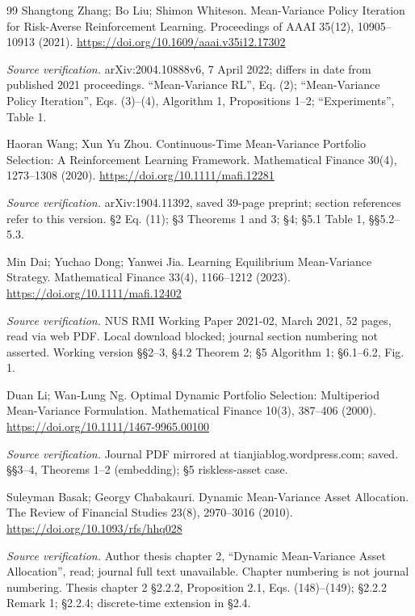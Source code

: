 \documentclass[11pt,a4paper]{article}
\theoremstyle{plain}
\theoremstyle{definition}
\begin{document}
\begin{thebibliography}{99}
 Shangtong Zhang; Bo Liu; Shimon Whiteson. Mean-Variance Policy Iteration for Risk-Averse Reinforcement Learning. Proceedings of AAAI 35(12), 10905--10913 (2021). \url{https://doi.org/10.1609/aaai.v35i12.17302}
\par\smallskip\noindent\emph{Source verification.} arXiv:2004.10888v6, 7 April 2022; differs in date from published 2021 proceedings. ``Mean-Variance RL'', Eq. (2); ``Mean-Variance Policy Iteration'', Eqs. (3)--(4), Algorithm 1, Propositions 1--2; ``Experiments'', Table 1.

 Haoran Wang; Xun Yu Zhou. Continuous-Time Mean-Variance Portfolio Selection: A Reinforcement Learning Framework. Mathematical Finance 30(4), 1273--1308 (2020). \url{https://doi.org/10.1111/mafi.12281}
\par\smallskip\noindent\emph{Source verification.} arXiv:1904.11392, saved 39-page preprint; section references refer to this version. \S{}2 Eq. (11); \S{}3 Theorems 1 and 3; \S{}4; \S{}5.1 Table 1, \S{}\S{}5.2--5.3.

 Min Dai; Yuchao Dong; Yanwei Jia. Learning Equilibrium Mean-Variance Strategy. Mathematical Finance 33(4), 1166--1212 (2023). \url{https://doi.org/10.1111/mafi.12402}
\par\smallskip\noindent\emph{Source verification.} NUS RMI Working Paper 2021-02, March 2021, 52 pages, read via web PDF. Local download blocked; journal section numbering not asserted. Working version \S{}\S{}2--3, \S{}4.2 Theorem 2; \S{}5 Algorithm 1; \S{}6.1--6.2, Fig. 1.

 Duan Li; Wan-Lung Ng. Optimal Dynamic Portfolio Selection: Multiperiod Mean-Variance Formulation. Mathematical Finance 10(3), 387--406 (2000). \url{https://doi.org/10.1111/1467-9965.00100}
\par\smallskip\noindent\emph{Source verification.} Journal PDF mirrored at tianjiablog.wordpress.com; saved. \S{}\S{}3--4, Theorems 1--2 (embedding); \S{}5 riskless-asset case.

 Suleyman Basak; Georgy Chabakauri. Dynamic Mean-Variance Asset Allocation. The Review of Financial Studies 23(8), 2970--3016 (2010). \url{https://doi.org/10.1093/rfs/hhq028}
\par\smallskip\noindent\emph{Source verification.} Author thesis chapter 2, ``Dynamic Mean-Variance Asset Allocation'', read; journal full text unavailable. Chapter numbering is not journal numbering. Thesis chapter 2 \S{}2.2.2, Proposition 2.1, Eqs. (148)--(149); \S{}2.2.2 Remark 1; \S{}2.2.4; discrete-time extension in \S{}2.4.


\end{thebibliography}
\end{document}
